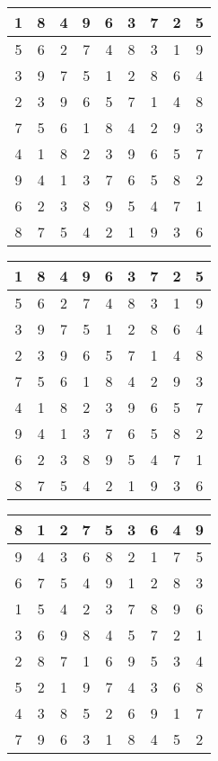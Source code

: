 \documentclass[]{article}
\begin{document}
\begin{table}[]
\begin{tabular}{c|c|c|c|c|c|c|c|c}
1 & 8 & 4 & 9 & 6 & 3 & 7 & 2 & 5 \\\hline
5 & 6 & 2 & 7 & 4 & 8 & 3 & 1 & 9 \\\hline
3 & 9 & 7 & 5 & 1 & 2 & 8 & 6 & 4 \\\hline
2 & 3 & 9 & 6 & 5 & 7 & 1 & 4 & 8 \\\hline
7 & 5 & 6 & 1 & 8 & 4 & 2 & 9 & 3 \\\hline
4 & 1 & 8 & 2 & 3 & 9 & 6 & 5 & 7 \\\hline
9 & 4 & 1 & 3 & 7 & 6 & 5 & 8 & 2 \\\hline
6 & 2 & 3 & 8 & 9 & 5 & 4 & 7 & 1 \\\hline
8 & 7 & 5 & 4 & 2 & 1 & 9 & 3 & 6 
\end{tabular}
\end{table}
\begin{table}[]
\begin{tabular}{c|c|c|c|c|c|c|c|c}
1 & 8 & 4 & 9 & 6 & 3 & 7 & 2 & 5 \\\hline
5 & 6 & 2 & 7 & 4 & 8 & 3 & 1 & 9 \\\hline
3 & 9 & 7 & 5 & 1 & 2 & 8 & 6 & 4 \\\hline
2 & 3 & 9 & 6 & 5 & 7 & 1 & 4 & 8 \\\hline
7 & 5 & 6 & 1 & 8 & 4 & 2 & 9 & 3 \\\hline
4 & 1 & 8 & 2 & 3 & 9 & 6 & 5 & 7 \\\hline
9 & 4 & 1 & 3 & 7 & 6 & 5 & 8 & 2 \\\hline
6 & 2 & 3 & 8 & 9 & 5 & 4 & 7 & 1 \\\hline
8 & 7 & 5 & 4 & 2 & 1 & 9 & 3 & 6 
\end{tabular}
\end{table}
\begin{table}[]
\begin{tabular}{c|c|c|c|c|c|c|c|c}
8 & 1 & 2 & 7 & 5 & 3 & 6 & 4 & 9 \\\hline
9 & 4 & 3 & 6 & 8 & 2 & 1 & 7 & 5 \\\hline
6 & 7 & 5 & 4 & 9 & 1 & 2 & 8 & 3 \\\hline
1 & 5 & 4 & 2 & 3 & 7 & 8 & 9 & 6 \\\hline
3 & 6 & 9 & 8 & 4 & 5 & 7 & 2 & 1 \\\hline
2 & 8 & 7 & 1 & 6 & 9 & 5 & 3 & 4 \\\hline
5 & 2 & 1 & 9 & 7 & 4 & 3 & 6 & 8 \\\hline
4 & 3 & 8 & 5 & 2 & 6 & 9 & 1 & 7 \\\hline
7 & 9 & 6 & 3 & 1 & 8 & 4 & 5 & 2 
\end{tabular}
\end{table}
\end{document}
